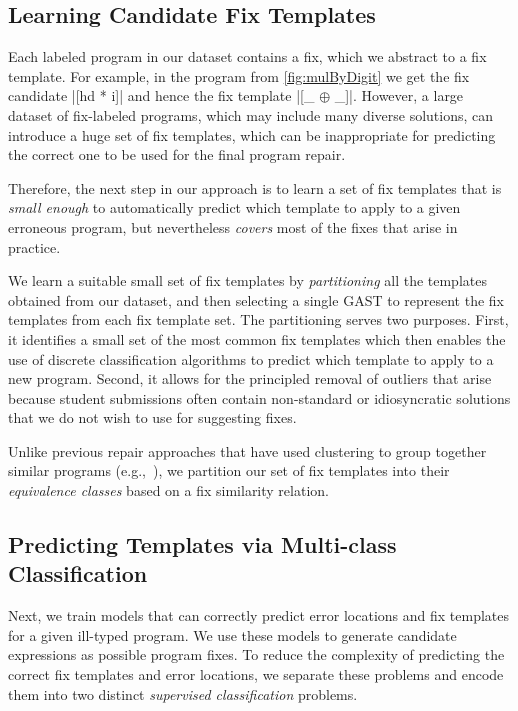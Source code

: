 \subsection{Learning Candidate Fix Templates}
\label{sec:overview:learn}

Each labeled program in our dataset contains a fix, which we abstract to a fix
template. For example, in the \mbd program from \autoref{fig:mulByDigit} we get
the fix candidate |[hd * i]| and hence the fix template |[_ $\oplus$ _]|.
However, a large dataset of fix-labeled programs, which may include many
diverse solutions, can introduce a huge set of fix templates, which can be
inappropriate for predicting the correct one to be used for the final program
repair.

Therefore, the next step in our approach is to learn a set of fix templates
that is \emph{small enough} to automatically predict which template to apply to
a given erroneous program, but nevertheless \emph{covers} most of the fixes that
arise in practice.

 We learn a suitable small set of fix
templates by \emph{partitioning} all the templates obtained from our dataset,
and then selecting a single GAST to represent the fix templates from each fix
template set.
%
The partitioning serves two purposes.
%
First, it identifies a small set of the most common fix templates which then
enables the use of discrete classification algorithms to predict which template
to apply to a new program.
%
Second, it allows for the principled removal of outliers that arise because
student submissions often contain non-standard or idiosyncratic solutions that
we do not wish to use for suggesting fixes.

Unlike previous repair approaches that have used clustering to group together
similar programs (e.g.,~\citep{Wang_2018, Gulwani_2018}), we partition our set of
fix templates into their \emph{equivalence classes} based on a fix similarity
relation.


\subsection{Predicting Templates via Multi-class Classification}
\label{sec:overview:predict}

Next, we train models that can correctly predict error locations and fix
templates for a given ill-typed program. We use these models to generate
candidate expressions as possible program fixes. To reduce the
complexity of predicting the correct fix templates and error locations, we
separate these problems and encode them into two distinct \emph{supervised
classification} problems.


